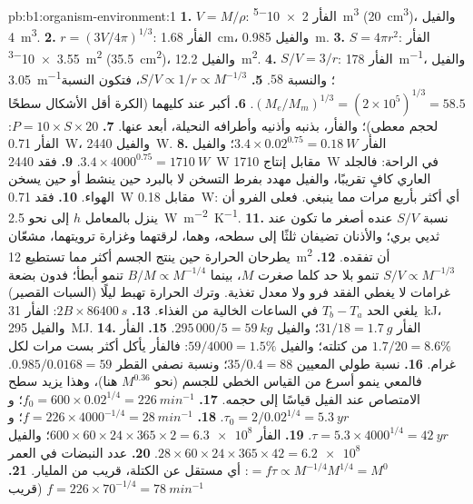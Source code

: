 \begin{solution}{pb:b1:organism-environment:1}
\textbf{1.} $V = M/\rho$: الفأر \qty{2e-5}{m^3} (\qty{20}{cm^3})،
والفيل \qty{4}{m^3}.
\textbf{2.} $r = (3V/4\pi)^{1/3}$: الفأر \qty{1.68}{cm}، والفيل
\qty{0.985}{m}.
\textbf{3.} $S = 4\pi r^2$: الفأر \qty{3.55e-3}{m^2}
(\qty{35.5}{cm^2})، والفيل \qty{12.2}{m^2}.
\textbf{4.} $S/V = 3/r$: الفأر \qty{178}{m^{-1}}، والفيل
\qty{3.05}{m^{-1}}؛ والنسبة $58$.
\textbf{5.} $S/V \propto 1/r \propto M^{-1/3}$، فتكون النسبة
$(M_e/M_m)^{1/3} = (2\times 10^5)^{1/3} = 58.5$.
\textbf{6.} أكبر عند كليهما (الكرة أقل الأشكال سطحًا لحجم معطى)؛
والفأر، بذنبه وأذنيه وأطرافه النحيلة، أبعد عنها.
\textbf{7.} $P = 10\times S\times 20$: الفأر \qty{0.71}{W}، والفيل
\qty{2440}{W}.
\textbf{8.} الفأر $3.4\times 0.02^{0.75} = \qty{0.18}{W}$؛ والفيل
$3.4\times 4000^{0.75} = \qty{1710}{W}$.
\textbf{9.} فقد \qty{2440}{W} مقابل إنتاج \qty{1710}{W} في الراحة:
فالجلد العاري كافٍ تقريبًا، والفيل مهدد بفرط التسخن لا بالبرد حين
ينشط أو حين يسخن الهواء.
\textbf{10.} فقد \qty{0.71}{W} مقابل \qty{0.18}{W}: أي أكثر بأربع
مرات مما ينبغي. فعلى الفرو أن ينزل بالمعامل $h$ إلى نحو
\qty{2.5}{W.m^{-2}.K^{-1}}.
\textbf{11.} نسبة $S/V$ عنده أصغر ما تكون عند ثديي بري؛ والأذنان
تضيفان ثلثًا إلى سطحه، وهما، لرقتهما وغزارة ترويتهما، مشعّان يطرحان
الحرارة حين ينتج الجسم أكثر مما تستطيع \qty{12}{m^2} أن تفقده.
\textbf{12.} $S/V \propto M^{-1/3}$ تنمو بلا حد كلما صغرت $M$،
بينما $B/M \propto M^{-1/4}$ تنمو أبطأ؛ فدون بضعة غرامات لا يغطي
الفقد فرو ولا معدل تغذية. وترك الحرارة تهبط ليلًا (السبات القصير)
يلغي الحد $T_b - T_a$ في الساعات الخالية من الغذاء.
\textbf{13.} $2B\times\qty{86400}{s}$: الفأر \qty{31}{kJ}، والفيل
\qty{295}{MJ}.
\textbf{14.} الفأر $31/18 = \qty{1.7}{g}$؛ والفيل
$295\,000/5 = \qty{59}{kg}$.
\textbf{15.} الفأر $1.7/20 = 8.6\%$ من كتلته؛ والفيل
$59/4000 =
1.5\%$: فالفأر يأكل أكثر بست مرات لكل غرام.
\textbf{16.} نسبة طولي المعيين $35/0.4 = 88$؛ ونسبة نصفي القطر
$0.985/0.0168
= 59$. فالمعي ينمو أسرع من القياس الخطي للجسم (نحو
$M^{0.36}$ هنا)، وهذا يزيد سطح الامتصاص عند الفيل قياسًا إلى حجمه.
\textbf{17.} $f_0 = 600\times 0.02^{1/4} = \qty{226}{min^{-1}}$؛
و$\tau_0 = 2/0.02^{1/4} = \qty{5.3}{yr}$.
\textbf{18.} $f = 226\times 4000^{-1/4} = \qty{28}{min^{-1}}$؛
و$\tau =
5.3\times 4000^{1/4} = \qty{42}{yr}$.
\textbf{19.} الفأر $600\times 60\times 24\times 365\times 2 =
\num{6.3e8}$؛ والفيل
$28\times 60\times 24\times 365\times 42 =
\num{6.2e8}$.
\textbf{20.} عدد النبضات في العمر
$= f\tau \propto M^{-1/4}M^{1/4} = M^0$: أي مستقل عن الكتلة، قريب
من المليار.
\textbf{21.} $f = 226\times 70^{-1/4} = \qty{78}{min^{-1}}$ (قريب

\end{solution}
